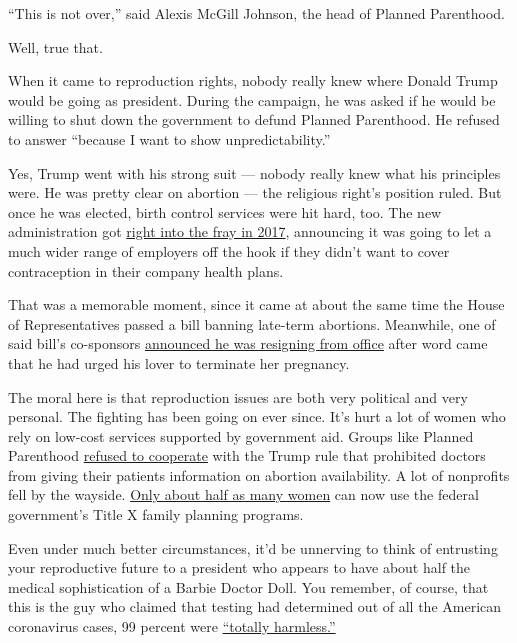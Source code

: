 ``This is not over,'' said Alexis McGill Johnson, the head of Planned
Parenthood.

Well, true that.

When it came to reproduction rights, nobody really knew where Donald
Trump would be going as president. During the campaign, he was asked if
he would be willing to shut down the government to defund Planned
Parenthood. He refused to answer ``because I want to show
unpredictability.''

Yes, Trump went with his strong suit --- nobody really knew what his
principles were. He was pretty clear on abortion --- the religious
right's position ruled. But once he was elected, birth control services
were hit hard, too. The new administration got
\href{https://www.nytimes3xbfgragh.onion/2017/10/06/us/politics/trump-contraception-birth-control.html}{right
into the fray in 2017}, announcing it was going to let a much wider
range of employers off the hook if they didn't want to cover
contraception in their company health plans.

That was a memorable moment, since it came at about the same time the
House of Representatives passed a bill banning late-term abortions.
Meanwhile, one of said bill's co-sponsors
\href{https://www.nytimes3xbfgragh.onion/2017/10/05/us/politics/tim-murphy-resigns-abortion-scandal.html}{announced
he was resigning from office} after word came that he had urged his
lover to terminate her pregnancy.

The moral here is that reproduction issues are both very political and
very personal. The fighting has been going on ever since. It's hurt a
lot of women who rely on low-cost services supported by government aid.
Groups like Planned Parenthood
\href{https://www.nytimes3xbfgragh.onion/2019/08/19/health/planned-parenthood-title-x.html}{refused
to cooperate} with the Trump rule that prohibited doctors from giving
their patients information on abortion availability. A lot of nonprofits
fell by the wayside.
\href{https://www.guttmacher.org/article/2020/02/trump-administrations-domestic-gag-rule-has-slashed-title-x-networks-capacity-half}{Only
about half as many women} can now use the federal government's Title X
family planning programs.

Even under much better circumstances, it'd be unnerving to think of
entrusting your reproductive future to a president who appears to have
about half the medical sophistication of a Barbie Doctor Doll. You
remember, of course, that this is the guy who claimed that testing had
determined out of all the American coronavirus cases, 99 percent were
\href{https://www.washingtonpost.com/politics/2020/07/08/trumps-claim-that-99-percent-covid-9-cases-are-totally-harmless/}{``totally
harmless.''}

